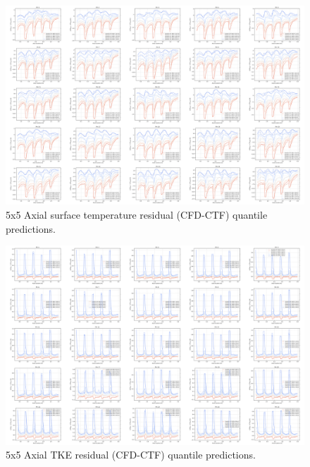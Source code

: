 \begin{landscape}
\begin{figure}[H]
    \centering
    \includegraphics[width=0.96\linewidth]{figs/ml_fit/q_twall_regression_montage_sm}
    \caption{5x5 Axial surface temperature residual (CFD-CTF)  quantile predictions.}
    \label{fig:qtwallregressionmontagesm}
\end{figure}


\begin{figure}[H]
    \centering
    \includegraphics[width=0.96\linewidth]{figs/ml_fit/q_tke_regression_montage_sm}
    \caption{5x5 Axial TKE residual (CFD-CTF) quantile predictions.}
    \label{fig:qtkeregressionmontagesm}
\end{figure}


\end{landscape}
